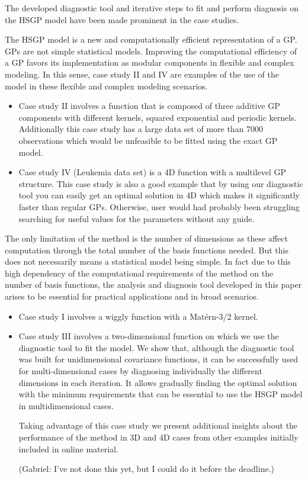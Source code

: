 \documentclass[11pt]{report}
\begin{document}
The developed diagnostic tool and iterative steps to fit and perform diagnosis on the HSGP model have been made prominent in the case studies.

The HSGP model is a new and computationally efficient representation of a GP. GPs are not simple statistical models. Improving the computational efficiency of a GP favors its implementation as modular components in flexible and complex modeling. In this sense, case study II and IV are examples of the use of the model in these flexible and complex modeling scenarios.

\begin{itemize}
\item Case study II involves a function that is composed of three additive GP components with different kernels, squared exponential and periodic kernels. Additionally this case study has a large data set of more than 7000 observations which would be unfeasible to be fitted using the exact GP model.

\item Case study IV (Leukemia data set) is a 4D function with a multilevel GP structure. This case study is also a good example that by using our diagnostic tool you can easily get an optimal solution in 4D which makes it significantly faster than regular GPs. Otherwise, user would had probably been struggling searching for useful values for the parameters without any guide.
\end{itemize}

The only limitation of the method is the number of dimensions as these affect computation through the total number of the basis functions needed. But this does not necessarily means a statistical model being simple.
In fact due to this high dependency of the computational requirements of the method on the number of basis functions, the analysis and diagnosis tool developed in this paper arises to be essential for practical applications and in broad scenarios.

\begin{itemize}
\item Case study I involves a wiggly function with a Mat\'ern-3/2 kernel. 

\item Case study III involves a two-dimensional function on which we use the diagnostic tool to fit the model. We show that, although the diagnostic tool was built for unidimensional covariance functions, it can be successfully used for multi-dimensional cases by diagnosing individually the different dimensions in each iteration. It allows gradually finding the optimal solution with the minimum requirements that can be essential to use the HSGP model in multidimensional cases. 

Taking advantage of this case study we present additional insights about the performance of the method in 3D and 4D cases from other examples initially included in online material.

{\color{red} (Gabriel: I've not done this yet, but I could do it before the deadline.)}
\end{itemize}
\end{document}
